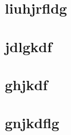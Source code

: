 \documentclass[11pt]{article}
\author{liupeitao}
\date{\today}
\title{}
\begin{document}
\tableofcontents

\section{liuhjrfldg}
\label{sec:orge03d538}
\section{jdlgkdf}
\label{sec:org8f2be61}
\section{ghjkdf}
\label{sec:org5ad8780}
\section{gnjkdflg}
\label{sec:orgc1d330c}
\end{document}
